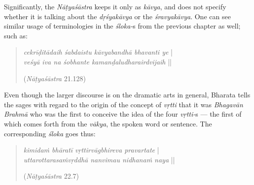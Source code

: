 Significantly, the \textsl{Nāṭyaśāstra} keeps it only as \textsl{kāvya}, and does not specify whether it is talking about the \textsl{dṛśyakāvya} or the \textsl{śravyakāvya}. One can see similar usage of terminologies in the \textsl{śloka-}s from the previous chapter as well; such as:
\begin{quote}
\textsl{cekrīḍitādaih śabdaistu kāvyabandhā bhavanti ye} |  \\
\textsl{veśyā iva na śobhante kamanḍaludharairdvijaih} ||

\hfill(\textsl{Nāṭyaśāstra} 21.128)
\end{quote}

Even though the larger discourse is on the dramatic arts in general, Bharata tells the sages with regard to the origin of the concept of \textsl{vṛtti} that it was \textsl{Bhagavān Brahmā} who was the first to conceive the idea of the four \textsl{vṛtti-}s --- the first of which comes forth from the \textsl{vākya}, the spoken word or sentence. The corresponding \textsl{śloka} goes thus:
\begin{quote}
\textsl{kimidaṁ bhāratī vṛttirvāgbhireva pravartate} |  \\
\textsl{uttarottarasaṁvṛddhā nanvimau nidhanaṁ naya} || 

\hfill(\textsl{Nāṭyaśāstra} 22.7)
\end{quote}

